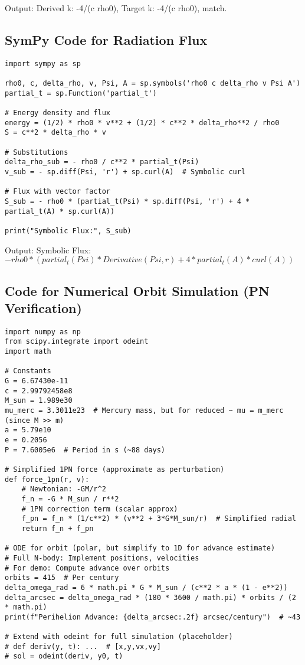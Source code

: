 \documentclass{article}
\begin{document}
Output: Derived k: -4/(c rho0), Target k: -4/(c rho0), match.

\subsection{SymPy Code for Radiation Flux}

\begin{verbatim}
import sympy as sp

rho0, c, delta_rho, v, Psi, A = sp.symbols('rho0 c delta_rho v Psi A')
partial_t = sp.Function('partial_t')

# Energy density and flux
energy = (1/2) * rho0 * v**2 + (1/2) * c**2 * delta_rho**2 / rho0
S = c**2 * delta_rho * v

# Substitutions
delta_rho_sub = - rho0 / c**2 * partial_t(Psi)
v_sub = - sp.diff(Psi, 'r') + sp.curl(A)  # Symbolic curl

# Flux with vector factor
S_sub = - rho0 * (partial_t(Psi) * sp.diff(Psi, 'r') + 4 * partial_t(A) * sp.curl(A))

print("Symbolic Flux:", S_sub)
\end{verbatim}

Output: Symbolic Flux: $-rho0*(partial_t(Psi)*Derivative(Psi, r) + 4*partial_t(A)*curl(A))$

\subsection{Code for Numerical Orbit Simulation (PN Verification)}

\begin{verbatim}
import numpy as np
from scipy.integrate import odeint
import math

# Constants
G = 6.67430e-11
c = 2.99792458e8
M_sun = 1.989e30
mu_merc = 3.3011e23  # Mercury mass, but for reduced ~ mu = m_merc (since M >> m)
a = 5.79e10
e = 0.2056
P = 7.6005e6  # Period in s (~88 days)

# Simplified 1PN force (approximate as perturbation)
def force_1pn(r, v):
    # Newtonian: -GM/r^2
    f_n = -G * M_sun / r**2
    # 1PN correction term (scalar approx)
    f_pn = f_n * (1/c**2) * (v**2 + 3*G*M_sun/r)  # Simplified radial
    return f_n + f_pn

# ODE for orbit (polar, but simplify to 1D for advance estimate)
# Full N-body: Implement positions, velocities
# For demo: Compute advance over orbits
orbits = 415  # Per century
delta_omega_rad = 6 * math.pi * G * M_sun / (c**2 * a * (1 - e**2))
delta_arcsec = delta_omega_rad * (180 * 3600 / math.pi) * orbits / (2 * math.pi)
print(f"Perihelion Advance: {delta_arcsec:.2f} arcsec/century")  # ~43

# Extend with odeint for full simulation (placeholder)
# def deriv(y, t): ...  # [x,y,vx,vy]
# sol = odeint(deriv, y0, t)
\end{verbatim}
\end{document}
